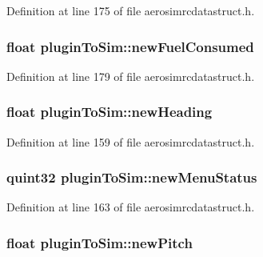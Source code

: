 \-Definition at line 175 of file aerosimrcdatastruct.\-h.

\hypertarget{group___aero_sim_r_c_ga8a8341d7559a5dfa620a7c486f2dc023}{
\subsubsection[{new\-Fuel\-Consumed}]{\setlength{\rightskip}{0pt plus 5cm}float {\bf plugin\-To\-Sim\-::new\-Fuel\-Consumed}}}\label{group___aero_sim_r_c_ga8a8341d7559a5dfa620a7c486f2dc023}


\-Definition at line 179 of file aerosimrcdatastruct.\-h.

\hypertarget{group___aero_sim_r_c_ga11677816070d9ac5bc78d2c45338c0ec}{
\subsubsection[{new\-Heading}]{\setlength{\rightskip}{0pt plus 5cm}float {\bf plugin\-To\-Sim\-::new\-Heading}}}\label{group___aero_sim_r_c_ga11677816070d9ac5bc78d2c45338c0ec}


\-Definition at line 159 of file aerosimrcdatastruct.\-h.

\hypertarget{group___aero_sim_r_c_ga17602d21cacd40328f97406fb577e7a7}{
\subsubsection[{new\-Menu\-Status}]{\setlength{\rightskip}{0pt plus 5cm}quint32 {\bf plugin\-To\-Sim\-::new\-Menu\-Status}}}\label{group___aero_sim_r_c_ga17602d21cacd40328f97406fb577e7a7}


\-Definition at line 163 of file aerosimrcdatastruct.\-h.

\hypertarget{group___aero_sim_r_c_gae5174be9526399eb834a21d1d1e996d1}{
\subsubsection[{new\-Pitch}]{\setlength{\rightskip}{0pt plus 5cm}float {\bf plugin\-To\-Sim\-::new\-Pitch}}}\label{group___aero_sim_r_c_gae5174be9526399eb834a21d1d1e996d1}


